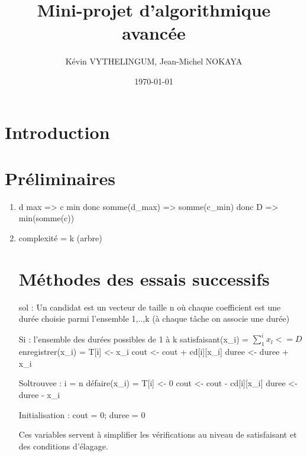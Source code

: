 \documentclass[a4paper, titlepage]{article}
\title{Mini-projet d'algorithmique avancée}      %
\author{Kévin VYTHELINGUM, Jean-Michel NOKAYA}           %
\date{\today}           %
\begin{document}
\maketitle
\tableofcontents
\newpage
\large

\section{Introduction}

\section{Préliminaires}

\begin{enumerate}
\item
	d max => c min
	donc somme(d_max) => somme(c_min)
	donc D => min(somme(c))
\item
	complexité = k (arbre)
	
\section{Méthodes des essais successifs}
	sol : Un candidat est un vecteur de taille n où chaque coefficient est une durée choisie parmi l'ensemble {1,..,k} (à chaque tâche on associe une durée)
	
	Si : l'ensemble des durées possibles de 1 à k
	satisfaisant(x_{i}) = $\sum_{1}^{i} x_{l} <= D$
	enregistrer(x_{i}) = T[i] <- x_{i}
			     cout <- cout + cd[i][x_{i}]
			     duree <- duree + x_{i}
			     
	Soltrouvee : i = n
	défaire(x_{i}) = T[i] <- 0
			 cout <- cout - cd[i][x_{i}]
			 duree <- duree - x_{i}
			 
	Initialisation : cout = 0; duree = 0
	
		Ces variables servent à simplifier les vérifications au niveau de satisfaisant et des conditions d'élagage.
	
\end{enumerate}
\end{document}
